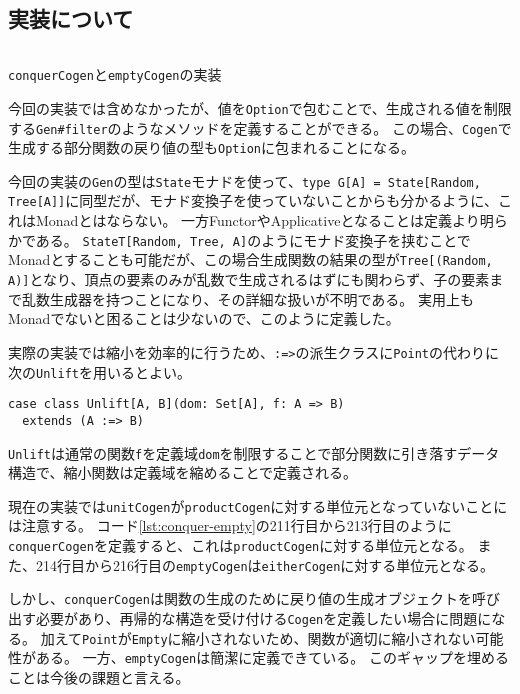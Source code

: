 \documentclass[submit,PRO]{ipsj}
\theoremstyle{definition}
\begin{document}
\subsection{実装について}

\begin{listing*}[hbt]
  \inputminted[breaklines,autogobble,linenos,firstline=211,lastline=216]{scala}{../src/main/scala/minicheck.scala}
  \caption{\texttt{conquerCogen}と\texttt{emptyCogen}の実装}
  \label{lst:conquer-empty}
\end{listing*}

今回の実装では含めなかったが、値を\texttt{Option}で包むことで、生成される値を制限する\texttt{Gen\#filter}のようなメソッドを定義することができる。
この場合、\texttt{Cogen}で生成する部分関数の戻り値の型も\texttt{Option}に包まれることになる。

今回の実装の\texttt{Gen}の型は\texttt{State}モナドを使って、\texttt{type G[A] = State[Random, Tree[A]]}に同型だが、モナド変換子を使っていないことからも分かるように、これはMonadとはならない。
一方FunctorやApplicativeとなることは定義より明らかである。
\texttt{StateT[Random, Tree, A]}のようにモナド変換子を挟むことでMonadとすることも可能だが、この場合生成関数の結果の型が\texttt{Tree[(Random, A)]}となり、頂点の要素のみが乱数で生成されるはずにも関わらず、子の要素まで乱数生成器を持つことになり、その詳細な扱いが不明である。
実用上もMonadでないと困ることは少ないので、このように定義した。

実際の実装では縮小を効率的に行うため、\texttt{:=>}の派生クラスに\texttt{Point}の代わりに次の\texttt{Unlift}を用いるとよい。

\begin{verbatim}
case class Unlift[A, B](dom: Set[A], f: A => B)
  extends (A :=> B)
\end{verbatim}

\texttt{Unlift}は通常の関数\texttt{f}を定義域\texttt{dom}を制限することで部分関数に引き落すデータ構造で、縮小関数は定義域を縮めることで定義される。

現在の実装では\texttt{unitCogen}が\texttt{productCogen}に対する単位元となっていないことには注意する。
コード\ref{lst:conquer-empty}の211行目から213行目のように\texttt{conquerCogen}を定義すると、これは\texttt{productCogen}に対する単位元となる。
また、214行目から216行目の\texttt{emptyCogen}は\texttt{eitherCogen}に対する単位元となる。

しかし、\texttt{conquerCogen}は関数の生成のために戻り値の生成オブジェクトを呼び出す必要があり、再帰的な構造を受け付ける\texttt{Cogen}を定義したい場合に問題になる。
加えて\texttt{Point}が\texttt{Empty}に縮小されないため、関数が適切に縮小されない可能性がある。
一方、\texttt{emptyCogen}は簡潔に定義できている。
このギャップを埋めることは今後の課題と言える。
\end{document}

